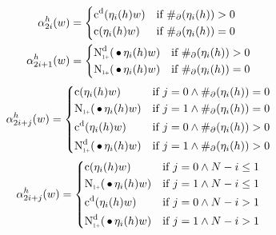 \begin{subequations}
  \begin{align}
    \SumArg_{2 i}^h(w) &=
      \begin{dcases*}
        \DiscountedCount(\History_i(h) w)        & if $\NumSkpOp(\History_i(h)) > 0$ \\
        \Count(\History_i(h) w)                  & if $\NumSkpOp(\History_i(h)) = 0$
      \end{dcases*} \\
    \SumArg_{2 i + 1}^h(w) &=
      \begin{dcases*}
        \DiscountedCount*(\WSkp \History_i(h) w) & if $\NumSkpOp(\History_i(h)) > 0$ \\
        \ContCountIp(\WSkp \History_i(h) w)      & if $\NumSkpOp(\History_i(h)) = 0$
      \end{dcases*}
  \end{align}
\end{subequations}
\begin{equation}
  \SumArg_{2 i + j}^h(w) =
    \begin{dcases*}
      \Count(\History_i(h) w)                  & if $j = 0 \land \NumSkpOp(\History_i(h)) = 0$ \\
      \ContCountIp(\WSkp \History_i(h) w)      & if $j = 1 \land \NumSkpOp(\History_i(h)) = 0$ \\
      \DiscountedCount(\History_i(h) w)        & if $j = 0 \land \NumSkpOp(\History_i(h)) > 0$ \\
      \DiscountedCount*(\WSkp \History_i(h) w) & if $j = 1 \land \NumSkpOp(\History_i(h)) > 0$
    \end{dcases*}
\end{equation}
\begin{equation}
  \SumArg_{2 i + j}^h(w) =
    \begin{dcases*}
      \Count(\History_i(h) w)                  & if $j = 0 \land N - i \leq 1$ \\
      \ContCountIp(\WSkp \History_i(h) w)      & if $j = 1 \land N - i \leq 1$ \\
      \DiscountedCount(\History_i(h) w)        & if $j = 0 \land N - i > 1$ \\
      \DiscountedCount*(\WSkp \History_i(h) w) & if $j = 1 \land N - i > 1$
    \end{dcases*}
\end{equation}

